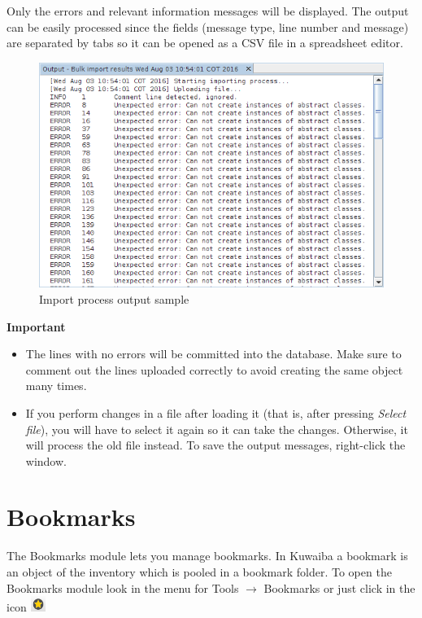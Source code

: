 \documentclass[a4paper]{article}
\begin{document}
				Only the errors and relevant information messages will be displayed. The output can be easily processed since the fields (message type, line number and message)	are separated by tabs so it can be opened as a CSV file in a spreadsheet editor. 
				
				\begin{figure}[h!]
					\centering
					\includegraphics[width=0.7\linewidth]{img/bulk_import_output_window.png}
					\caption{Import process output sample}
					\label{fig:bulk_import_output_window}
				\end{figure}	
				
				\newpage
				\begin{framed} {\large \textbf{Important}}
					\begin{itemize}
					\item The lines with no errors will be committed into the database. Make sure to comment out the lines uploaded correctly to avoid creating the same object many times.
					
					\item If you perform changes in a file after loading it (that is, after pressing \textit{Select file}), you will have to select it again so it can take the changes. Otherwise, it will process the old file instead. To save the output messages, right-click the window.
					\end{itemize}
				\end{framed}
		\newpage
		\section{Bookmarks}\label{sec:bookmarks}
		
			The Bookmarks module lets you manage bookmarks. In Kuwaiba a bookmark is an object of the inventory which is pooled in a bookmark folder. To open the Bookmarks module look in the menu for Tools $\rightarrow$ Bookmarks or just click in the icon
			\includegraphics[width=0.5cm]{img/icon_bookmarks.png}
			
\end{document}
